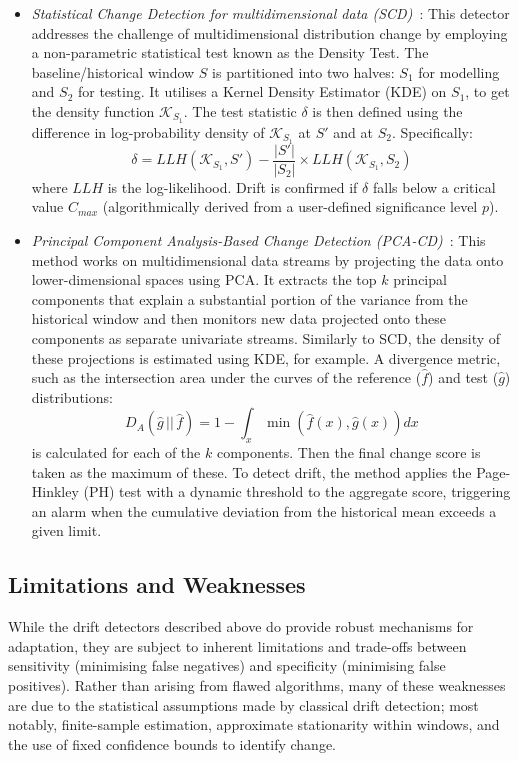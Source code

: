 \begin{itemize}
    \item \textit{Statistical Change Detection for multidimensional data (SCD)}~\cite{Song_2007}: This detector addresses the challenge of multidimensional distribution change by employing a non-parametric statistical test known as the Density Test. The baseline/historical window $S$ is partitioned into two halves: $S_1$ for modelling and $S_2$ for testing. It utilises a Kernel Density Estimator (KDE) on $S_1$, to get the density function $\mathscr{K}_{S_1}$. The test statistic $\delta$ is then defined using the difference in log-probability density of $\mathscr{K}_{S_1}$ at $S'$ and at $S_2$. Specifically:
    \begin{equation}
        \delta = LLH(\mathscr{K}_{S_1}, S') - \frac{|S'|}{|S_2|} \times LLH(\mathscr{K}_{S_1}, S_2)
    \end{equation}
    where $LLH$ is the log-likelihood. Drift is confirmed if $\delta$ falls below a critical value $C_{max}$ (algorithmically derived from a user-defined significance level $p$).

    \item \textit{Principal Component Analysis-Based Change Detection (PCA-CD)}~\cite{Qahtan_2015}: This method works on multidimensional data streams by projecting the data onto lower-dimensional spaces using PCA. It extracts the top $k$ principal components that explain a substantial portion of the variance from the historical window and then monitors new data projected onto these components as separate univariate streams. Similarly to SCD, the density of these projections is estimated using KDE, for example. A divergence metric, such as the intersection area under the curves of the reference ($\hat{f}$) and test ($\hat{g}$) distributions:
    \begin{equation}
        D_{A}\left(\hat{g}\,||\,\hat{f}\right) = 1 - \int_{x} \min\left(\hat{f}(x), \hat{g}(x)\right) dx
    \end{equation}
    is calculated for each of the $k$ components. Then the final change score is taken as the maximum of these. To detect drift, the method applies the Page-Hinkley (PH) test with a dynamic threshold to the aggregate score, triggering an alarm when the cumulative deviation from the historical mean exceeds a given limit.
\end{itemize}

\subsection{Limitations and Weaknesses}
While the drift detectors described above do provide robust mechanisms for adaptation, they are subject to inherent limitations and trade-offs between sensitivity (minimising false negatives) and specificity (minimising false positives). Rather than arising from flawed algorithms, many of these weaknesses are due to the statistical assumptions made by classical drift detection; most notably, finite-sample estimation, approximate stationarity within windows, and the use of fixed confidence bounds to identify change.

